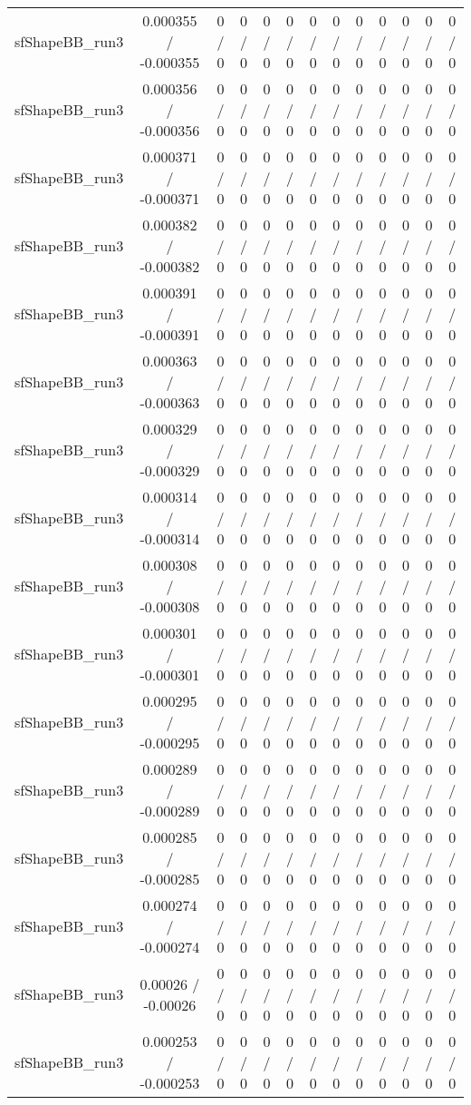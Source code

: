 \documentclass[10pt]{article}
\begin{document}
\begin{table}[htbp]
\begin{center}
\begin{tabular}{|c|c|c|c|c|c|c|c|c|c|c|c|c|}
  sfShapeBB_run3 & 0.000355 / -0.000355 & 0 / 0 & 0 / 0 & 0 / 0 & 0 / 0 & 0 / 0 & 0 / 0 & 0 / 0 & 0 / 0 & 0 / 0 & 0 / 0 & 0 / 0 \\ 
  sfShapeBB_run3 & 0.000356 / -0.000356 & 0 / 0 & 0 / 0 & 0 / 0 & 0 / 0 & 0 / 0 & 0 / 0 & 0 / 0 & 0 / 0 & 0 / 0 & 0 / 0 & 0 / 0 \\ 
  sfShapeBB_run3 & 0.000371 / -0.000371 & 0 / 0 & 0 / 0 & 0 / 0 & 0 / 0 & 0 / 0 & 0 / 0 & 0 / 0 & 0 / 0 & 0 / 0 & 0 / 0 & 0 / 0 \\ 
  sfShapeBB_run3 & 0.000382 / -0.000382 & 0 / 0 & 0 / 0 & 0 / 0 & 0 / 0 & 0 / 0 & 0 / 0 & 0 / 0 & 0 / 0 & 0 / 0 & 0 / 0 & 0 / 0 \\ 
  sfShapeBB_run3 & 0.000391 / -0.000391 & 0 / 0 & 0 / 0 & 0 / 0 & 0 / 0 & 0 / 0 & 0 / 0 & 0 / 0 & 0 / 0 & 0 / 0 & 0 / 0 & 0 / 0 \\ 
  sfShapeBB_run3 & 0.000363 / -0.000363 & 0 / 0 & 0 / 0 & 0 / 0 & 0 / 0 & 0 / 0 & 0 / 0 & 0 / 0 & 0 / 0 & 0 / 0 & 0 / 0 & 0 / 0 \\ 
  sfShapeBB_run3 & 0.000329 / -0.000329 & 0 / 0 & 0 / 0 & 0 / 0 & 0 / 0 & 0 / 0 & 0 / 0 & 0 / 0 & 0 / 0 & 0 / 0 & 0 / 0 & 0 / 0 \\ 
  sfShapeBB_run3 & 0.000314 / -0.000314 & 0 / 0 & 0 / 0 & 0 / 0 & 0 / 0 & 0 / 0 & 0 / 0 & 0 / 0 & 0 / 0 & 0 / 0 & 0 / 0 & 0 / 0 \\ 
  sfShapeBB_run3 & 0.000308 / -0.000308 & 0 / 0 & 0 / 0 & 0 / 0 & 0 / 0 & 0 / 0 & 0 / 0 & 0 / 0 & 0 / 0 & 0 / 0 & 0 / 0 & 0 / 0 \\ 
  sfShapeBB_run3 & 0.000301 / -0.000301 & 0 / 0 & 0 / 0 & 0 / 0 & 0 / 0 & 0 / 0 & 0 / 0 & 0 / 0 & 0 / 0 & 0 / 0 & 0 / 0 & 0 / 0 \\ 
  sfShapeBB_run3 & 0.000295 / -0.000295 & 0 / 0 & 0 / 0 & 0 / 0 & 0 / 0 & 0 / 0 & 0 / 0 & 0 / 0 & 0 / 0 & 0 / 0 & 0 / 0 & 0 / 0 \\ 
  sfShapeBB_run3 & 0.000289 / -0.000289 & 0 / 0 & 0 / 0 & 0 / 0 & 0 / 0 & 0 / 0 & 0 / 0 & 0 / 0 & 0 / 0 & 0 / 0 & 0 / 0 & 0 / 0 \\ 
  sfShapeBB_run3 & 0.000285 / -0.000285 & 0 / 0 & 0 / 0 & 0 / 0 & 0 / 0 & 0 / 0 & 0 / 0 & 0 / 0 & 0 / 0 & 0 / 0 & 0 / 0 & 0 / 0 \\ 
  sfShapeBB_run3 & 0.000274 / -0.000274 & 0 / 0 & 0 / 0 & 0 / 0 & 0 / 0 & 0 / 0 & 0 / 0 & 0 / 0 & 0 / 0 & 0 / 0 & 0 / 0 & 0 / 0 \\ 
  sfShapeBB_run3 & 0.00026 / -0.00026 & 0 / 0 & 0 / 0 & 0 / 0 & 0 / 0 & 0 / 0 & 0 / 0 & 0 / 0 & 0 / 0 & 0 / 0 & 0 / 0 & 0 / 0 \\ 
  sfShapeBB_run3 & 0.000253 / -0.000253 & 0 / 0 & 0 / 0 & 0 / 0 & 0 / 0 & 0 / 0 & 0 / 0 & 0 / 0 & 0 / 0 & 0 / 0 & 0 / 0 & 0 / 0 \\ 

\end{tabular}
\end{center}
\end{table}
\end{document}
